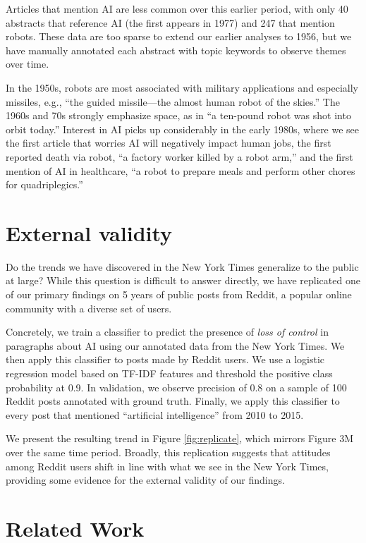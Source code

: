 \documentclass[letterpaper]{article}
\begin{document}
Articles that mention AI are less common over this earlier period, with only 40 abstracts that reference AI (the first appears in 1977) and 247 that mention robots. These data are too sparse to extend our earlier analyses to 1956, but we have manually annotated each abstract with topic keywords to observe themes over time.

In the 1950s, robots are most associated with military applications and especially missiles, e.g., ``the guided missile---the almost human robot of the skies.'' The 1960s and 70s strongly emphasize space, as in ``a ten-pound robot was shot into orbit today.'' Interest in AI picks up considerably in the early 1980s, where we see the first article that worries AI will negatively impact human jobs, the first reported death via robot, ``a factory worker killed by a robot arm,'' and the first mention of AI in healthcare, ``a robot to prepare meals and perform other chores for quadriplegics.''

\section{External validity}

Do the trends we have discovered in the New York Times generalize to the public at large? While this question is difficult to answer directly, we have replicated one of our primary findings on 5 years of public posts from Reddit, a popular online community with a diverse set of users.

Concretely, we train a classifier to predict the presence of \textit{loss of control} in paragraphs about AI using our annotated data from the New York Times. We then apply this classifier to posts made by Reddit users. We use a logistic regression model based on TF-IDF features and threshold the positive class probability at 0.9. In validation, we observe precision of 0.8 on a sample of 100 Reddit posts annotated with ground truth. Finally, we apply this classifier to every post that mentioned ``artificial intelligence'' from 2010 to 2015.

We present the resulting trend in Figure \ref{fig:replicate}, which mirrors Figure 3M over the same time period. Broadly, this replication suggests that attitudes among Reddit users shift in line with what we see in the New York Times, providing some evidence for the external validity of our findings.

\section{Related Work}
\end{document}
